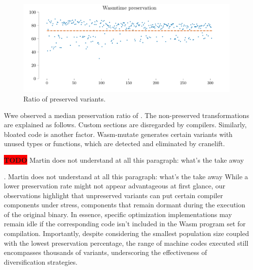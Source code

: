 \documentclass[sigplan,screen]{acmart}
\newcommand*\badge[1]{ \colorbox{red}{\color{white}#1}}
\newcommand{\tool}{Wasm-mutate\xspace}
\newcommand{\wasm}{Wasm\xspace}
\newcommand{\todo}[1]{%
\refstepcounter{todo}
\noindent\textbf{\badge{TODO}} {\color{red}#1}
\addcontentsline{td}{todo}
{\color{red}\thesection.\thetodo\xspace #1}}
\begin{document}
\begin{figure}
    \centering
    \includegraphics[width=\linewidth]{plots/rq1/preservation.pdf}
    \caption{Ratio of preserved variants.}
  \label{rq1:plot:preservation}
\end{figure}

Wwe observed a median preservation ratio of \preserved. 
The non-preserved transformations are explained as follows. 
Custom sections are disregarded by compilers.
Similarly, bloated code is another factor. 
\tool generates certain variants with unused types or functions, which are detected and eliminated by cranelift.




\todo{Martin does not understand at all this paragraph: what's the take away}
While a lower preservation rate might not appear advantageous at first glance, our observations highlight that unpreserved variants can put certain compiler components under stress, components that remain dormant during the execution of the original binary. 
In essence, specific optimization implementations may remain idle if the corresponding code isn't included in the \wasm program set for compilation. 
Importantly, despite considering the smallest population size coupled with the lowest preservation percentage, the range of machine codes executed still encompasses thousands of variants, underscoring the effectiveness of diversification strategies.


\end{document}
